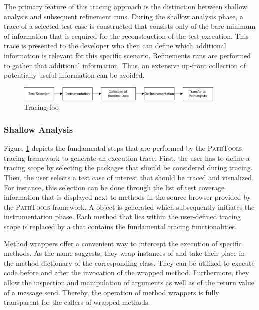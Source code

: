 The primary feature of this tracing approach is the distinction between shallow analysis and subsequent refinement runs.
During the shallow analysis phase, a trace of a selected test case is constructed that consists only of the bare minimum of information that is required for the reconstruction of the test execution.
This trace is presented to the developer who then can define which additional information is relevant for this specific scenario.
Refinements runs are performed to gather that additional information.
Thus, an extensive up-front collection of potentially useful information can be avoided.

\begin{figure}[tb]
	\centering
	\includegraphics[width=0.9\textwidth]{../images/02-TracingProcess}
	\caption[TOC Caption]{Tracing foo}
	\label{fig:BackgroundTracingApproach}
\end{figure}

\subsubsection{Shallow Analysis}
Figure \ref{fig:BackgroundTracingApproach} depicts the fundamental steps that are performed by the \textsc{PathTools} tracing framework to generate an execution trace.
First, the user has to define a tracing scope by selecting the packages that should be considered during tracing.
Then, the user selects a test case of interest that should be traced and visualized.
For instance, this selection can be done through the list of test coverage information that is displayed next to methods in the source browser provided by the \textsc{PathTools} framework.
A  object is generated which subsequently initiates the instrumentation phase.
Each method that lies within the user-defined tracing scope is replaced by a  that contains the fundamental tracing functionalities.

Method wrappers \cite{brant_wrappers_1998} offer a convenient way to intercept the execution of specific methods.
As the name suggests, they wrap instances of  and take their place in the method dictionary of the corresponding class.
They can be utilized to execute code before and after the invocation of the wrapped method.
Furthermore, they allow the inspection and manipulation of arguments as well as of the return value of a message send.
Thereby, the operation of method wrappers is fully transparent for the callers of wrapped methods.


